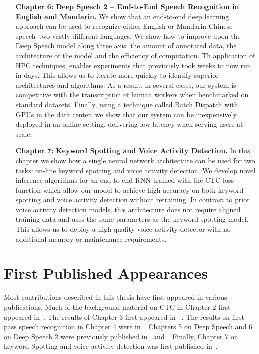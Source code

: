 \begin{itemize}
    \item [{\bf Chapter 6:}]{\bf Deep Speech 2 -- End-to-End Speech Recognition
        in English and Mandarin.} We show that an end-to-end deep learning
        approach can be used to recognize either English or Mandarin Chinese
        speech–two vastly different languages. We show how to improve upon the
        Deep Speech model along three axis: the amount of annotated data, the
        architecture of the model and the efficiency of computation.  Th
        application of HPC techniques, enables experiments that previously took
        weeks to now run in days. This allows us to iterate more quickly to
        identify superior architectures and algorithms.  As a result, in
        several cases, our system is competitive with the transcription of
        human workers when benchmarked on standard datasets.  Finally, using a
        technique called Batch Dispatch with GPUs in the data center, we show
        that our system can be inexpensively deployed in an online setting,
        delivering low latency when serving users at scale.

    \item [{\bf Chapter 7:}]{\bf Keyword Spotting and Voice Activity
        Detection.} In this chapter we show how a single neural network
        architecture can be used for two tasks: on-line keyword spotting and
        voice activity detection. We develop novel inference algorithms for an
        end-to-end RNN trained with the CTC loss function which allow our model
        to achieve high accuracy on both keyword spotting and voice activity
        detection without retraining. In contrast to prior voice activity
        detection models, this architecture does not require aligned training
        data and uses the same parameters as the keyword spotting model. This
        allows us to deploy a high quality voice activity detector with no
        additional memory or maintenance requirements.

\end{itemize}

\section{First Published Appearances}
Most contributions described in this thesis have first appeared in various
publications. Much of the background material on CTC in Chapter 2 first
appeared in~\cite{rajpurkar2017}. The results of Chapter 3 first appeared in
~\cite{hannun2017sequence}. The results on first-pass speech recognition in
Chapter 4 were in~\cite{hannun2014firstpass}. Chapters 5 on Deep Speech and 6
on Deep Speech 2 were previously published in~\cite{hannun2014deepspeech}
and~\cite{amodei2016deep}. Finally, Chapter 7 on keyword Spotting and voice
activity detection was first published in~\cite{lengerich2016}.

